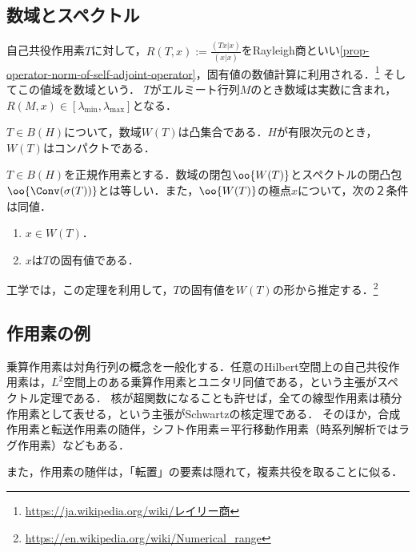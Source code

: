 \documentclass[uplatex,dvipdfmx]{jsreport}
\begin{document}
\subsection{数域とスペクトル}

\begin{tcolorbox}[colframe=ForestGreen, colback=ForestGreen!10!white,breakable,colbacktitle=ForestGreen!40!white,coltitle=black,fonttitle=\bfseries\sffamily,
title=]
    自己共役作用素$T$に対して，$R(T,x):=\frac{(Tx|x)}{(x|x)}$をRayleigh商といい\ref{prop-operator-norm-of-self-adjoint-operator}，固有値の数値計算に利用される．\footnote{\url{https://ja.wikipedia.org/wiki/レイリー商}}
    そしてこの値域を数域という．
    $T$がエルミート行列$M$のとき数域は実数に含まれ，$R(M,x)\in[\lambda_\mathrm{min},\lambda_\mathrm{max}]$となる．
\end{tcolorbox}

\begin{proposition}
    $T\in B(H)$について，数域$W(T)$は凸集合である．$H$が有限次元のとき，$W(T)$はコンパクトである．
\end{proposition}

\begin{proposition}
    $T\in B(H)$を正規作用素とする．数域の閉包$\oo{W(T)}$とスペクトルの閉凸包$\oo{\Conv(\sigma(T))}$とは等しい．また，$\oo{W(T)}$の極点$x$について，次の２条件は同値．
    \begin{enumerate}
        \item $x\in W(T)$．
        \item $x$は$T$の固有値である．
    \end{enumerate}
\end{proposition}
\begin{remark}
    工学では，この定理を利用して，$T$の固有値を$W(T)$の形から推定する．\footnote{\url{https://en.wikipedia.org/wiki/Numerical_range}}
\end{remark}

\subsection{作用素の例}

\begin{tcolorbox}[colframe=ForestGreen, colback=ForestGreen!10!white,breakable,colbacktitle=ForestGreen!40!white,coltitle=black,fonttitle=\bfseries\sffamily,
title=]
    乗算作用素は対角行列の概念を一般化する．任意のHilbert空間上の自己共役作用素は，$L^2$空間上のある乗算作用素とユニタリ同値である，という主張がスペクトル定理である．
    核が超関数になることも許せば，全ての線型作用素は積分作用素として表せる，という主張がSchwartzの核定理である．
    そのほか，合成作用素と転送作用素の随伴，シフト作用素＝平行移動作用素（時系列解析ではラグ作用素）などもある．

    また，作用素の随伴は，「転置」の要素は隠れて，複素共役を取ることに似る．
\end{tcolorbox}
\end{document}
